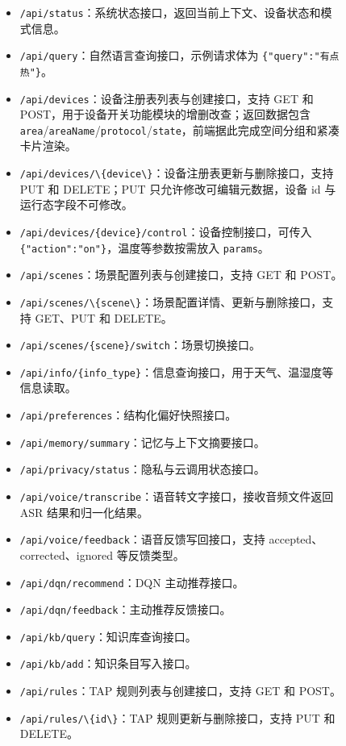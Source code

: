 \documentclass[12pt,a4paper,oneside]{ctexrep}
\begin{document}
\begin{figure}[H]
\begin{itemize}
    \item \texttt{/api/status}：系统状态接口，返回当前上下文、设备状态和模式信息。
    \item \texttt{/api/query}：自然语言查询接口，示例请求体为 \texttt{\{"query":"有点热"\}}。
    \item \verb|/api/devices|：设备注册表列表与创建接口，支持 GET 和 POST，用于设备开关功能模块的增删改查；返回数据包含 \texttt{area}/\texttt{areaName}/\texttt{protocol}/\texttt{state}，前端据此完成空间分组和紧凑卡片渲染。
    \item \verb|/api/devices/\{device\}|：设备注册表更新与删除接口，支持 PUT 和 DELETE；PUT 只允许修改可编辑元数据，设备 id 与运行态字段不可修改。
    \item \texttt{/api/devices/\{device\}/control}：设备控制接口，可传入 \texttt{\{"action":"on"\}}，温度等参数按需放入 \texttt{params}。
    \item \verb|/api/scenes|：场景配置列表与创建接口，支持 GET 和 POST。
    \item \verb|/api/scenes/\{scene\}|：场景配置详情、更新与删除接口，支持 GET、PUT 和 DELETE。
    \item \texttt{/api/scenes/\{scene\}/switch}：场景切换接口。
    \item \texttt{/api/info/\{info\_type\}}：信息查询接口，用于天气、温湿度等信息读取。
    \item \texttt{/api/preferences}：结构化偏好快照接口。
    \item \texttt{/api/memory/summary}：记忆与上下文摘要接口。
    \item \texttt{/api/privacy/status}：隐私与云调用状态接口。
    \item \verb|/api/voice/transcribe|：语音转文字接口，接收音频文件返回 ASR 结果和归一化结果。
    \item \verb|/api/voice/feedback|：语音反馈写回接口，支持 accepted、corrected、ignored 等反馈类型。
    \item \verb|/api/dqn/recommend|：DQN 主动推荐接口。
    \item \verb|/api/dqn/feedback|：主动推荐反馈接口。
    \item \verb|/api/kb/query|：知识库查询接口。
    \item \verb|/api/kb/add|：知识条目写入接口。
    \item \verb|/api/rules|：TAP 规则列表与创建接口，支持 GET 和 POST。
    \item \verb|/api/rules/\{id\}|：TAP 规则更新与删除接口，支持 PUT 和 DELETE。

\end{itemize}
\end{figure}
\end{document}
